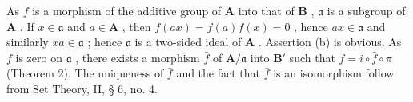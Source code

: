 As \(f\) is a morphism of the additive group of \(\mathbf{A}\) into that of \(\mathbf{B}\) , \(\mathfrak{a}\) is a subgroup of \(\mathbf{A}\) . If \(x \in \mathfrak{a}\) and \(a \in \mathbf{A}\) , then \(f(ax) = f(a)f(x) = 0\) , hence \(ax \in \mathfrak{a}\) and similarly \(xa \in \mathfrak{a}\) ; hence \(\mathfrak{a}\) is a two-sided ideal of \(\mathbf{A}\) . Assertion (b) is obvious. As \(f\) is zero on \(\mathfrak{a}\) , there exists a morphism \(\bar{f}\) of \(\mathbf{A} / \mathfrak{a}\) into \(\mathbf{B}'\) such that \(f = i \circ \bar{f} \circ \pi\) (Theorem 2). The uniqueness of \(\bar{f}\) and the fact that \(\bar{f}\) is an isomorphism follow from Set Theory, II, § 6, no. 4.

